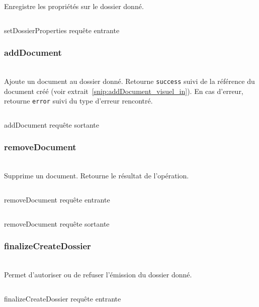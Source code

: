Enregistre les propriétés sur le dossier donné.

\begin{codesnippet}
\inputminted[frame=single,linenos,fontsize=\footnotesize]{javascript}{extraits/setDossierProperties_in.js}
\caption{setDossierProperties requête entrante}
\label{snip:setDossierProperties_in}
\end{codesnippet}


\subsubsection{addDocument}
\\

Ajoute un document au dossier donné. Retourne \verb|success| suivi de la référence du document créé (voir extrait~\ref{snip:addDocument_visuel_in}). En cas d'erreur, retourne \verb|error| suivi du type d'erreur rencontré.

\begin{codesnippet}
\inputminted[frame=single,linenos,fontsize=\footnotesize]{javascript}{extraits/addDocument_visuel_out.js}
\caption{addDocument requête sortante}
\label{snip:addDocument_visuel_out}
\end{codesnippet}


\subsubsection{removeDocument}
\\

Supprime un document. Retourne le résultat de l'opération.

\begin{codesnippet}
\inputminted[frame=single,linenos,fontsize=\footnotesize]{javascript}{extraits/removeDocument_in.js}
\caption{removeDocument requête entrante}
\label{snip:removeDocument_in}
\end{codesnippet}

\begin{codesnippet}
\inputminted[frame=single,linenos,fontsize=\footnotesize]{javascript}{extraits/removeDocument_out.js}
\caption{removeDocument requête sortante}
\label{snip:removeDocument_out}
\end{codesnippet}


\subsubsection{finalizeCreateDossier}
\\

Permet d'autoriser ou de refuser l'émission du dossier donné.

\begin{codesnippet}
\inputminted[frame=single,linenos,fontsize=\footnotesize]{javascript}{extraits/finalizeCreateDossier_in.js}
\caption{finalizeCreateDossier requête entrante}
\label{snip:finalizeCreateDossier_in}
\end{codesnippet}

